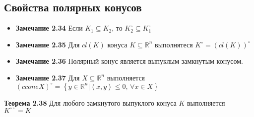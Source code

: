 \subsection{Свойства полярных конусов}
\begin{itemize}
\item \noindent\textbf{Замечание 2.34} Если $K_{1} \subseteq K_{2}$, то $K_{2}^{\circ} \subseteq K_{1}^{\circ}$
\item \noindent\textbf{Замечание 2.35} Для $cl(K)$ конуса $K\subseteq \mathbb{R}^n$ выполнятеся $K^{\circ}=(cl(K))^{\circ} $
\item \noindent\textbf{Замечание 2.36} Полярный конус является выпуклым замкнутым конусом.
\item \noindent\textbf{Замечание 2.37} Для $X\subseteq \mathbb{R}^n$ выполняется $(cconeX)^{\circ}=\left\lbrace y \in \mathbb{R}^n | \left\langle x,y \right\rangle \leq 0 \text{, } \forall x \in X \right\rbrace$
\end{itemize}
\noindent\textbf{Теорема 2.38} Для любого замкнутого выпуклого конуса $K$ выполняется $K^{\circ \circ}= K$
